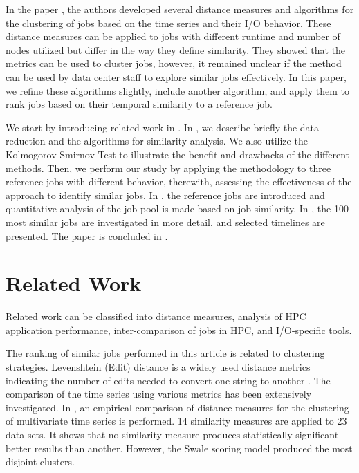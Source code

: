 \documentclass{jhps}
\begin{document}
In the paper \cite{Eugen20HPS}, the authors developed several distance measures and algorithms for the clustering of jobs based on the time series and their I/O behavior.
These distance measures can be applied to jobs with different runtime and number of nodes utilized but differ in the way they define similarity.
They showed that the metrics can be used to cluster jobs, however, it remained unclear if the method can be used by data center staff to explore similar jobs effectively.
In this paper, we refine these algorithms slightly, include another algorithm, and apply them to rank jobs based on their temporal similarity to a reference job.

We start by introducing related work in .
In , we describe briefly the data reduction and the algorithms for similarity analysis.
We also utilize the Kolmogorov-Smirnov-Test to illustrate the benefit and drawbacks of the different methods.
Then, we perform our study by applying the methodology to three reference jobs with different behavior, therewith, assessing the effectiveness of the approach to identify similar jobs.
In , the reference jobs are introduced and quantitative analysis of the job pool is made based on job similarity.
In , the 100 most similar jobs are investigated in more detail, and selected timelines are presented.
The paper is concluded in .

\section{Related Work}
\label{sec:relwork}

Related work can be classified into distance measures, analysis of HPC application performance, inter-comparison of jobs in HPC, and I/O-specific tools.

The ranking of similar jobs performed in this article is related to clustering strategies.
Levenshtein (Edit) distance is a widely used distance metrics indicating the number of edits needed to convert one string to another \cite{navarro2001guided}.
The comparison of the time series using various metrics has been extensively investigated.
In \cite{khotanlou2018empirical}, an empirical comparison of distance measures for the clustering of multivariate time series is performed.
14 similarity measures are applied to 23 data sets.
It shows that no similarity measure produces statistically significant better results than another.
However, the Swale scoring model \cite{morse2007efficient} produced the most disjoint clusters.
\end{document}
